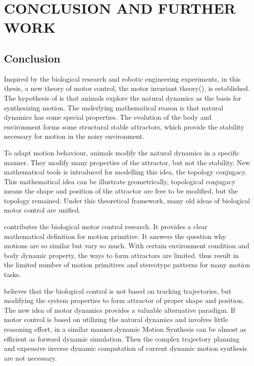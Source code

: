 \def\baselinestretch{1}
\chapter{CONCLUSION AND FURTHER WORK}
\label{chap:con}
\graphicspath{{Conclusions/ConclusionsFigs/EPS/}{Conclusions/ConclusionsFigs/}}


\def\baselinestretch{1.66}

\section{Conclusion}

Inspired by the biological research and robotic engineering experiments, in this thesis, a new theory of motor control, the motor invariant theory(\moit),  is established.
The hypothesis of \moit is that animals explore the natural dynamics as the basis for synthesizing motion.
The underlying mathematical reason is that natural dynamics has some special properties. 
The evolution of the body and environment forms some structural stable attractors, which provide the stability necessary for motion in the noisy environment.

To adapt motion behaviour, animals modify the natural dynamics in a specific manner.
They modify many properties of the attractor, but not the stability.
New mathematical tools is introduced for modelling this idea, the topology conjugacy.
This mathematical idea can be illustrate geometrically, topological conjugacy means the shape and position of the attractor are free to be modified, but the topology remained.
Under this theoretical framework, many old ideas of biological motor control are unified.


\moit contributes the biological motor control research.
It provides a clear mathematical definition for  motion primitive.
It answers the question why motions are so similar but vary so much.
With certain environment condition and body dynamic property, the ways to form attractors are limited.
thus result in the limited number of motion primitives and stereotype patterns for many motion tasks.

\moit believes that the biological control is not based on tracking trajectories,
but modifying the system properties to form attractor of proper shape and position.
The new idea of motor dynamics provides a valuable alternative paradigm.
If motor control is based on utilizing the natural dynamics and involves little reasoning effort,
in a similar manner,dynamic Motion Synthesis can be almost as efficient as forward dynamic simulation.
Then the complex trajectory planning and expensive inverse dynamic computation of current dynamic motion synthesis are not necessary.

